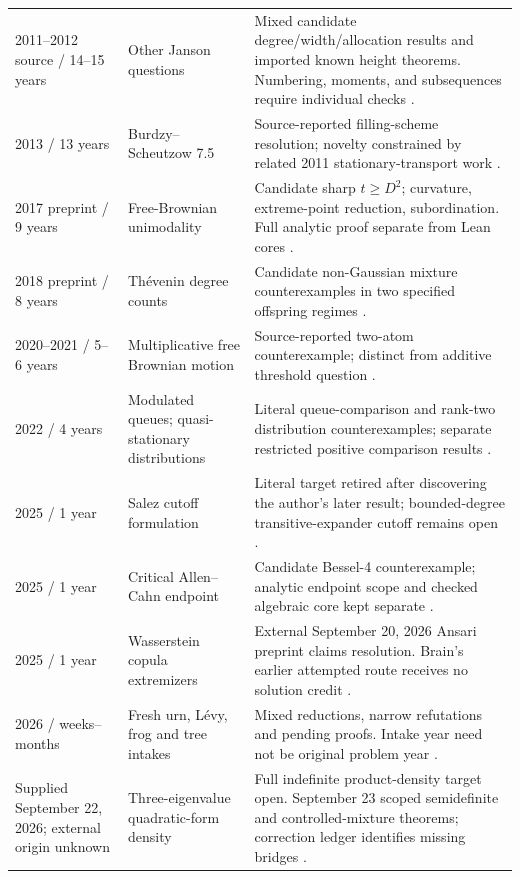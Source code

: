 \begin{longtable}{p{}p{}p{}}
2011--2012 source / 14--15 years & Other Janson questions & Mixed candidate degree/width/allocation results and imported known height theorems. Numbering, moments, and subsequences require individual checks \citep{Janson2012,CaseCampaignIndex2026}.\\[0.55em]
2013 / 13 years & Burdzy--Scheutzow 7.5 & Source-reported filling-scheme resolution; novelty constrained by related 2011 stationary-transport work \citep{CaseCampaignIndex2026}.\\[0.55em]
2017 preprint / 9 years & Free-Brownian unimodality & Candidate sharp $t\geq D^2$; curvature, extreme-point reduction, subordination. Full analytic proof separate from Lean cores \citep{HasebeUeda2018,CaseFreeUnimodality2026}.\\[0.55em]
2018 preprint / 8 years & Th\'evenin degree counts & Candidate non-Gaussian mixture counterexamples in two specified offspring regimes \citep{TheveninDegreeCounts,CaseThevenin2026}.\\[0.55em]
2020--2021 / 5--6 years & Multiplicative free Brownian motion & Source-reported two-atom counterexample; distinct from additive threshold question \citep{CaseCampaignIndex2026}.\\[0.55em]
2022 / 4 years & Modulated queues; quasi-stationary distributions & Literal queue-comparison and rank-two distribution counterexamples; separate restricted positive comparison results \citep{CaseCampaignIndex2026}.\\[0.55em]
2025 / 1 year & Salez cutoff formulation & Literal target retired after discovering the author's later result; bounded-degree transitive-expander cutoff remains open \citep{CaseCampaignIndex2026,CaseProgress2026}.\\[0.55em]
2025 / 1 year & Critical Allen--Cahn endpoint & Candidate Bessel-4 counterexample; analytic endpoint scope and checked algebraic core kept separate \citep{CaseCampaignIndex2026}.\\[0.55em]
2025 / 1 year & Wasserstein copula extremizers & External September 20, 2026 Ansari preprint claims resolution. Brain's earlier attempted route receives no solution credit \citep{Ansari2026Copula,CaseBrainUsageG0013}.\\[0.55em]
2026 / weeks--months & Fresh urn, L\'evy, frog and tree intakes & Mixed reductions, narrow refutations and pending proofs. Intake year need not be original problem year \citep{CaseCampaignIndex2026}.\\[0.55em]
Supplied September 22, 2026; external origin unknown & Three-eigenvalue quadratic-form density & Full indefinite product-density target open. September 23 scoped semidefinite and controlled-mixture theorems; correction ledger identifies missing bridges \citep{CaseQFORMRelease2026}.\\
\end{longtable}
\endgroup
